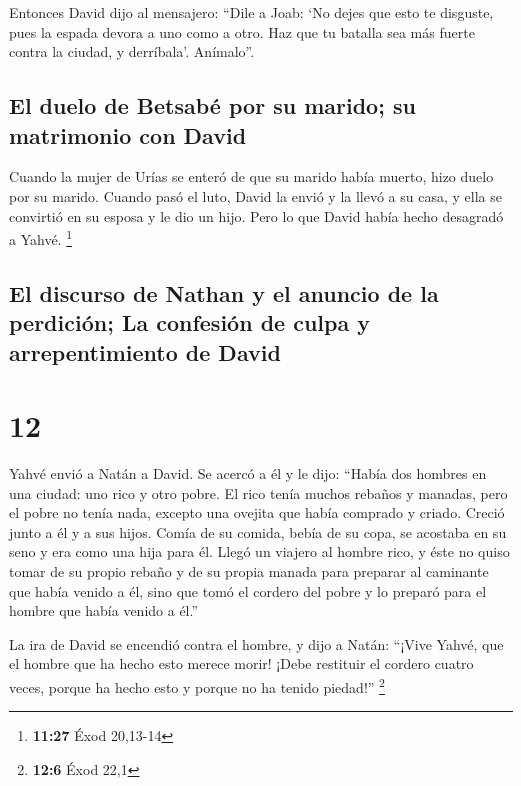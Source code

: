  Entonces David dijo al mensajero: ``Dile a Joab: `No
dejes que esto te disguste, pues la espada devora a uno como a otro. Haz
que tu batalla sea más fuerte contra la ciudad, y derríbala'. Anímalo''.

\hypertarget{el-duelo-de-betsabuxe9-por-su-marido-su-matrimonio-con-david}{%
\subsection{El duelo de Betsabé por su marido; su matrimonio con
David}\label{el-duelo-de-betsabuxe9-por-su-marido-su-matrimonio-con-david}}

 Cuando la mujer de Urías se enteró de que su marido
había muerto, hizo duelo por su marido.  Cuando pasó el
luto, David la envió y la llevó a su casa, y ella se convirtió en su
esposa y le dio un hijo. Pero lo que David había hecho desagradó a
Yahvé. \footnote{\textbf{11:27} Éxod 20,13-14}

\hypertarget{el-discurso-de-nathan-y-el-anuncio-de-la-perdiciuxf3n-la-confesiuxf3n-de-culpa-y-arrepentimiento-de-david}{%
\subsection{El discurso de Nathan y el anuncio de la perdición; La
confesión de culpa y arrepentimiento de
David}\label{el-discurso-de-nathan-y-el-anuncio-de-la-perdiciuxf3n-la-confesiuxf3n-de-culpa-y-arrepentimiento-de-david}}

\hypertarget{section-11}{%
\section{12}\label{section-11}}

 Yahvé envió a Natán a David. Se acercó a él y le dijo:
``Había dos hombres en una ciudad: uno rico y otro pobre. 
El rico tenía muchos rebaños y manadas,  pero el pobre no
tenía nada, excepto una ovejita que había comprado y criado. Creció
junto a él y a sus hijos. Comía de su comida, bebía de su copa, se
acostaba en su seno y era como una hija para él.  Llegó un
viajero al hombre rico, y éste no quiso tomar de su propio rebaño y de
su propia manada para preparar al caminante que había venido a él, sino
que tomó el cordero del pobre y lo preparó para el hombre que había
venido a él.''

 La ira de David se encendió contra el hombre, y dijo a
Natán: ``¡Vive Yahvé, que el hombre que ha hecho esto merece morir!
 ¡Debe restituir el cordero cuatro veces, porque ha hecho
esto y porque no ha tenido piedad!'' \footnote{\textbf{12:6} Éxod 22,1}

